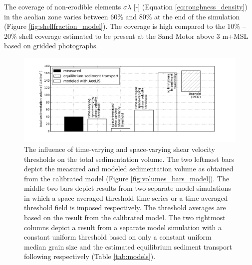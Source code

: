 The coverage of non-erodible elements $\sigma \lambda$ [-] (Equation
\ref{eq:roughness_density}) in the aeolian zone varies between 60\%
and 80\% at the end of the simulation (Figure
\ref{fig:shellfraction_model}). The coverage is high compared to the
10\% -- 20\% shell coverage estimated to be present at the Sand Motor
above 3 m+MSL based on gridded photographs.

\begin{figure}
  \centering
  \includegraphics[width=\columnwidth]{../Figures/space_vs_time}
  \caption{The influence of time-varying and space-varying shear
    velocity thresholds on the total sedimentation volume. The two
    leftmost bars depict the measured and modeled sedimentation volume
    as obtained from the calibrated model (Figure
    \ref{fig:volumes_bars_model}). The middle two bars depict results
    from two separate model simulations in which a space-averaged
    threshold time series or a time-averaged threshold field is
    imposed respectively. The threshold averages are based on the
    result from the calibrated model. The two rightmost columns depict
    a result from a separate model simulation with a constant uniform
    threshold based on only a constant uniform median grain size and
    the estimated equilibrium sediment transport following
    \citet{Bagnold1937a} respectively (Table \ref{tab:models}).}
  \label{fig:space_vs_time}
\end{figure}

